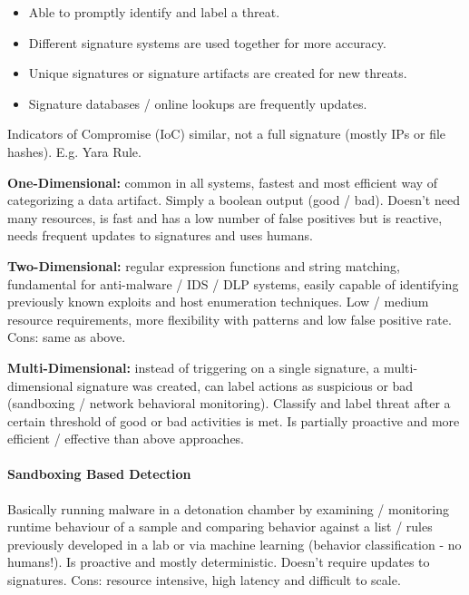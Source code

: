 \begin{itemize}
    \item Able to promptly identify and label a threat.
    \item Different signature systems are used together for more accuracy.
    \item Unique signatures or signature artifacts are created for new threats.
    \item Signature databases / online lookups are frequently updates.
\end{itemize}

Indicators of Compromise (IoC) similar, not a full signature (mostly IPs or file hashes). E.g. Yara Rule.


\textbf{One-Dimensional:} common in all systems, fastest and most efficient way of categorizing a data artifact. Simply a boolean output (good / bad). Doesn't need many resources, is fast and has a low number of false positives but is reactive, needs frequent updates to signatures and uses humans.

\textbf{Two-Dimensional:} regular expression functions and string matching, fundamental for anti-malware / IDS / DLP systems, easily capable of identifying previously known exploits and host enumeration techniques. Low / medium resource requirements, more flexibility with patterns and low false positive rate. Cons: same as above.

\textbf{Multi-Dimensional:} instead of triggering on a single signature, a multi-dimensional signature was created, can label actions as suspicious or bad (sandboxing / network behavioral monitoring). Classify and label threat after a certain threshold of good or bad activities is met. Is partially proactive and more efficient / effective than above approaches.

\paragraph{Sandboxing Based Detection}
Basically running malware in a detonation chamber by examining / monitoring runtime behaviour of a sample and comparing behavior against a list / rules previously developed in a lab or via machine learning (behavior classification - no humans!). Is proactive and mostly deterministic. 
Doesn't require updates to signatures. Cons: resource intensive, high latency and difficult to scale.

